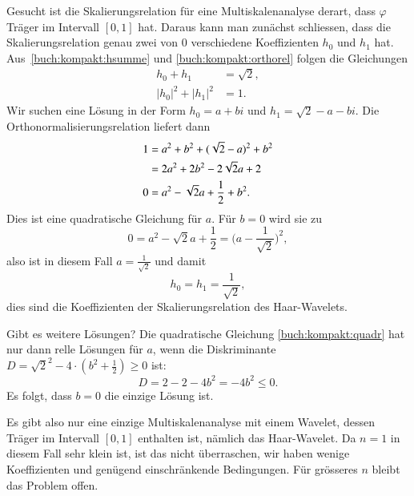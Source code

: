 \begin{beispiel}
Gesucht ist die Skalierungsrelation für eine Multiskalenanalyse derart,
dass $\varphi$ Träger im Intervall $[0,1]$ hat.
Daraus kann man zunächst schliessen, dass die Skalierungsrelation
genau zwei von $0$ verschiedene Koeffizienten $h_0$ und $h_1$ hat.
Aus~\eqref{buch:kompakt:hsumme} und \eqref{buch:kompakt:orthorel}
folgen die Gleichungen
\begin{align*}
h_0+h_1&=\sqrt{2},
\\
|h_0|^2+|h_1|^2&=1.
\end{align*}
Wir suchen eine Lösung in der Form $h_0=a+bi$ und $h_1=\sqrt{2}-a-bi$.
Die Orthonormalisierungsrelation liefert dann
\begin{align}
1
&=
a^2 + b^2
+
(\sqrt{2}-a)^2 + b^2
\notag
\\
&=
2a^2 + 2b^2 - 2\sqrt{2}a + 2
\notag
\\
0
&=
a^2 - \sqrt{2}a + \frac12 + b^2.
\label{buch:kompakt:quadr}
\end{align}
Dies ist eine quadratische Gleichung für $a$.
Für $b=0$ wird sie zu
\[
0
=
a^2 - \sqrt{2}a + \frac12
=
\biggl(a-\frac1{\sqrt{2}}\biggr)^2,
\]
also ist in diesem Fall $a=\frac1{\sqrt{2}}$ und damit
\[
h_0=h_1=\frac{1}{\sqrt{2}},
\]
dies sind die Koeffizienten der Skalierungsrelation des Haar-Wavelets.

Gibt es weitere Lösungen?
Die quadratische Gleichung \eqref{buch:kompakt:quadr} hat nur dann
relle Lösungen für $a$, wenn die Diskriminante
$D=\sqrt{2}^2 - 4\cdot (b^2+\frac12) \ge 0$ ist:
\[
D=2-2-4b^2 =-4b^2\le 0.
\]
Es folgt, dass $b=0$ die einzige Lösung ist.
\end{beispiel}

Es gibt also nur eine einzige Multiskalenanalyse mit einem Wavelet,
dessen Träger im Intervall $[0,1]$ enthalten ist, nämlich das Haar-Wavelet.
Da $n=1$ in diesem Fall sehr klein ist, ist das nicht überraschen, wir
haben wenige Koeffizienten und genügend einschränkende Bedingungen.
Für grösseres $n$ bleibt das Problem offen.

